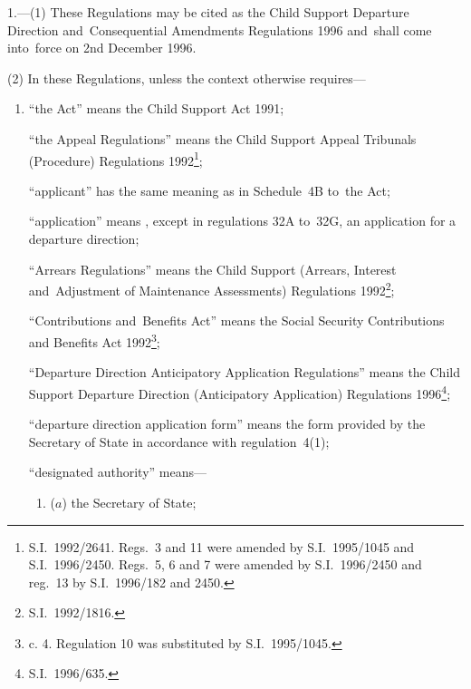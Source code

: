 \documentclass[12pt,a4paper]{article}
\begin{document}
\renewcommand\parthead{--- Part~I}

1.—(1) These Regulations
may be cited as the Child Support Departure Direction and~Consequential
Amendments Regulations 1996 and~shall come into~force on 2nd December 1996.

(2) In these Regulations, unless the context otherwise requires—
\begin{enumerate}\item[]
“the Act” means the Child Support Act 1991;

“the Appeal Regulations” means the Child Support Appeal Tribunals (Procedure)
Regulations 1992\footnote{S.I.~1992/2641. Regs.~3 and 11 were amended by S.I.~1995/1045 and S.I.~1996/2450. Regs.\ 5, 6 and 7 were amended by S.I.~1996/2450 and reg.~13 by S.I.~1996/182 and 2450.};

“applicant” has the same meaning as in Schedule~4B to~the Act;

“application” means%
, except in regulations 32A to~32G,  %
an application for a departure direction;

“Arrears Regulations” means the Child Support (Arrears, Interest and~Adjustment
of Maintenance Assessments) Regulations 1992\footnote{\frenchspacing S.I.~1992/1816.};


“Contributions and~Benefits Act” means the Social Security Contributions and
Benefits Act 1992\footnote{ c. 4. Regulation 10 was substituted by S.I.~1995/1045.};

“Departure Direction Anticipatory Application Regulations” means the Child
Support Departure Direction (Anticipatory Application) Regulations 1996\footnote{\frenchspacing S.I.~1996/635.};

“departure direction application form” means the form provided by the Secretary
of State in accordance with regulation~4(1);


“designated authority” means—
\begin{enumerate}\item[]
    ($a$) 
    the Secretary of State;


\end{enumerate}
\end{enumerate}
\end{document}
